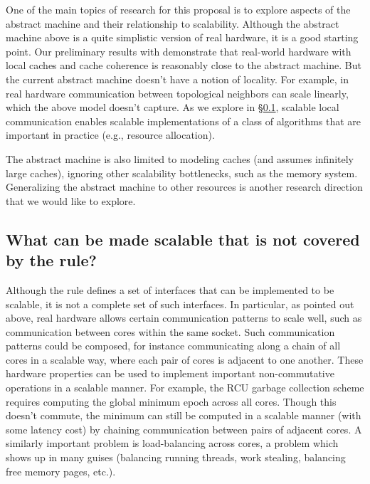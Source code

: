 One of the main topics of research for this proposal is to explore
aspects of the abstract machine and their relationship to scalability.
Although the abstract machine above is a quite simplistic version of
real hardware, it is a good starting point.  Our preliminary results
with \sys demonstrate that real-world hardware with local caches and
cache coherence is reasonably close to the abstract machine.
%
But the current abstract machine doesn't have a notion
of locality.  For example, in real hardware communication between
topological neighbors
can scale linearly, which the above model doesn't capture.  As we
explore in \S\ref{sec:asymptotic}, scalable local communication
enables scalable implementations of a class of algorithms that are
important in practice (e.g., resource allocation). 

The abstract machine is also limited to modeling
caches (and assumes infinitely large caches), ignoring other scalability
bottlenecks, such as the memory system.  Generalizing the abstract
machine to other resources is another research direction that we would
like to explore.


\subsection{What can be made scalable that is not covered by the rule?}
\label{sec:asymptotic}

Although the rule defines a set of interfaces that can be implemented to be
scalable, it is not a complete set of such interfaces.  In particular,
as pointed out above,
real hardware allows certain communication patterns
to scale well, such as communication between cores within the same socket.
Such communication patterns could
be composed, for instance communicating along a chain of all cores in
a scalable way, where each pair of cores is adjacent to one another.
%
These hardware properties can be used to implement important
non-commutative operations in a scalable manner.  For example, the RCU
garbage collection scheme requires computing the global minimum epoch
across all cores. Though this doesn't commute, the minimum can still be
computed in a scalable manner (with some latency cost) by chaining communication between pairs of
adjacent cores.
%
A similarly important problem is load-balancing across cores, a
problem which shows up in many guises (balancing running threads,
work stealing, balancing free memory pages, etc.).

